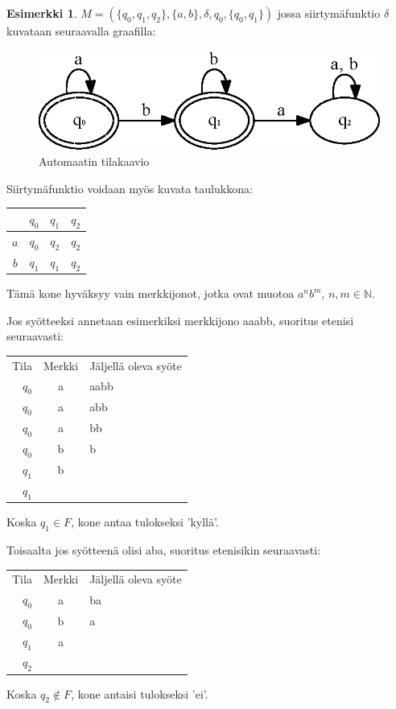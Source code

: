 \documentclass[a4paper, 12pt]{article}
\theoremstyle{definition}
\newtheorem{example}[mydef]{Esimerkki}
\theoremstyle{plain}
\begin{document}
\begin{example}
\label{ex:anbm}
$M = (\{q_0, q_1, q_2\}, \{a, b\}, \delta, q_0, \{q_0, q_1\})$ jossa siirtymäfunktio $\delta$ kuvataan seuraavalla graafilla:

\begin{figure}[H]
\centering
\includegraphics{graph2.eps}
\caption{Automaatin tilakaavio}
\end{figure}

Siirtymäfunktio voidaan myös kuvata taulukkona:
\\
\begin{center}
\begin{tabular} {c | c c c}
& $q_0$ & $q_1$ & $q_2$ \\
\hline
$a$ & $q_0$ & $q_2$ & $q_2$ \\
$b$ & $q_1$ & $q_1$ & $q_2$ \\
\end{tabular}
\end{center}

Tämä kone hyväksyy vain merkkijonot, jotka ovat muotoa $a^nb^m$, $n, m \in \mathbb{N}$.

Jos syötteeksi annetaan esimerkiksi merkkijono aaabb, suoritus etenisi seuraavasti:\\

\begin{center}
\begin{tabular}{r c l }
Tila & Merkki & Jäljellä oleva syöte \\
$q_0$ & a & aabb \\
$q_0$ & a & abb \\
$q_0$ & a & bb \\
$q_0$ & b & b \\
$q_1$ & b & \\
$q_1$ & & \\
\end{tabular}
\end{center}

Koska $q_1 \in F$, kone antaa tulokseksi 'kyllä'.

Toisaalta jos syötteenä olisi aba, suoritus etenisikin seuraavasti:
\\
\begin{center}
\begin{tabular}{r c l }
Tila & Merkki & Jäljellä oleva syöte \\
$q_0$ & a & ba \\
$q_0$ & b & a \\
$q_1$ & a &  \\
$q_2$ & & \\
\end{tabular}
\end{center}

Koska $q_2 \notin F$, kone antaisi tulokseksi 'ei'.
\end{example}
\end{document}
